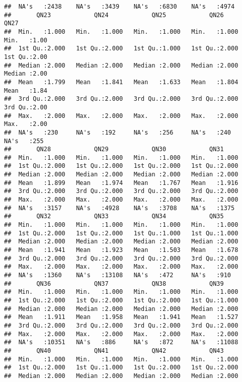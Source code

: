 \documentclass[
]{article}
\begin{document}
\begin{verbatim}
##  NA's   :2438    NA's   :3439    NA's   :6830    NA's   :4974   
##       QN23            QN24            QN25            QN26            QN27     
##  Min.   :1.000   Min.   :1.000   Min.   :1.000   Min.   :1.000   Min.   :1.00  
##  1st Qu.:2.000   1st Qu.:2.000   1st Qu.:1.000   1st Qu.:2.000   1st Qu.:2.00  
##  Median :2.000   Median :2.000   Median :2.000   Median :2.000   Median :2.00  
##  Mean   :1.799   Mean   :1.841   Mean   :1.633   Mean   :1.804   Mean   :1.84  
##  3rd Qu.:2.000   3rd Qu.:2.000   3rd Qu.:2.000   3rd Qu.:2.000   3rd Qu.:2.00  
##  Max.   :2.000   Max.   :2.000   Max.   :2.000   Max.   :2.000   Max.   :2.00  
##  NA's   :230     NA's   :192     NA's   :256     NA's   :240     NA's   :255   
##       QN28            QN29            QN30            QN31      
##  Min.   :1.000   Min.   :1.000   Min.   :1.000   Min.   :1.000  
##  1st Qu.:2.000   1st Qu.:2.000   1st Qu.:2.000   1st Qu.:2.000  
##  Median :2.000   Median :2.000   Median :2.000   Median :2.000  
##  Mean   :1.899   Mean   :1.974   Mean   :1.767   Mean   :1.916  
##  3rd Qu.:2.000   3rd Qu.:2.000   3rd Qu.:2.000   3rd Qu.:2.000  
##  Max.   :2.000   Max.   :2.000   Max.   :2.000   Max.   :2.000  
##  NA's   :3157    NA's   :4928    NA's   :3708    NA's   :1375   
##       QN32            QN33            QN34            QN35      
##  Min.   :1.000   Min.   :1.000   Min.   :1.000   Min.   :1.000  
##  1st Qu.:2.000   1st Qu.:2.000   1st Qu.:1.000   1st Qu.:1.000  
##  Median :2.000   Median :2.000   Median :2.000   Median :2.000  
##  Mean   :1.941   Mean   :1.923   Mean   :1.503   Mean   :1.678  
##  3rd Qu.:2.000   3rd Qu.:2.000   3rd Qu.:2.000   3rd Qu.:2.000  
##  Max.   :2.000   Max.   :2.000   Max.   :2.000   Max.   :2.000  
##  NA's   :1360    NA's   :13108   NA's   :472     NA's   :910    
##       QN36            QN37            QN38            QN39      
##  Min.   :1.000   Min.   :1.000   Min.   :1.000   Min.   :1.000  
##  1st Qu.:2.000   1st Qu.:2.000   1st Qu.:2.000   1st Qu.:1.000  
##  Median :2.000   Median :2.000   Median :2.000   Median :2.000  
##  Mean   :1.911   Mean   :1.958   Mean   :1.941   Mean   :1.527  
##  3rd Qu.:2.000   3rd Qu.:2.000   3rd Qu.:2.000   3rd Qu.:2.000  
##  Max.   :2.000   Max.   :2.000   Max.   :2.000   Max.   :2.000  
##  NA's   :10351   NA's   :886     NA's   :872     NA's   :11088  
##       QN40            QN41            QN42            QN43      
##  Min.   :1.000   Min.   :1.000   Min.   :1.000   Min.   :1.000  
##  1st Qu.:2.000   1st Qu.:1.000   1st Qu.:2.000   1st Qu.:2.000  
##  Median :2.000   Median :2.000   Median :2.000   Median :2.000  

\end{verbatim}
\end{document}
